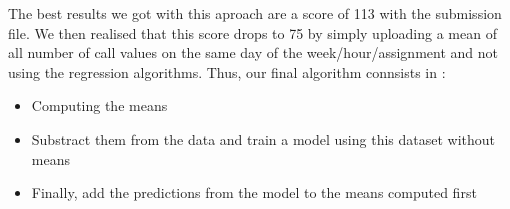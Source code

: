 \documentclass[english]{article}
\begin{document}
The best results we got with this aproach are a score of 113 with
the submission file. We then realised that this score drops to 75
by simply uploading a mean of all number of call values on the same
day of the week/hour/assignment and not using the regression algorithms.
Thus, our final algorithm connsists in : 
\begin{itemize}
\item Computing the means
\item Substract them from the data and train a model using this dataset
without means
\item Finally, add the predictions from the model to the means computed
first\end{itemize}
\end{document}
